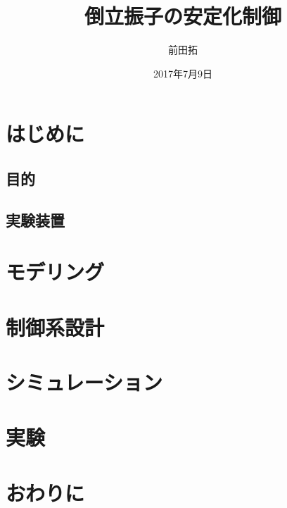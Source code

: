 \documentclass[a4j, 11pt, twoside]{jbook}
\begin{document}
\title{倒立振子の安定化制御}
\author{前田拓}
\date{2017年7月9日}
\maketitle

\tableofcontents
\listoffigures
\listoftables
{}

\chapter{はじめに}
\section{目的}
\section{実験装置}

\chapter{モデリング}

\chapter{制御系設計}

\chapter{シミュレーション}

\chapter{実験}

\chapter{おわりに}
\end{document}
